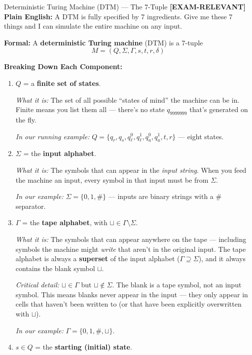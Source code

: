 \documentclass[11pt,a4paper]{article}
\newcommand{\kemark}{\textcolor{red!70!black}{\textbf{[EXAM-RELEVANT]}}}
\begin{document}
\begin{definitionbox}{Deterministic Turing Machine (DTM) --- The 7-Tuple \kemark}
\textbf{Plain English:} A DTM is fully specified by 7 ingredients. Give me these 7 things and I can simulate the entire machine on any input.

\textbf{Formal:} A \textbf{deterministic Turing machine} (DTM) is a 7-tuple
$$M = (Q, \Sigma, \Gamma, s, t, r, \delta)$$

\textbf{Breaking Down Each Component:}

\begin{enumerate}
\item $Q$ = a \textbf{finite set of states}.

\textit{What it is:} The set of all possible ``states of mind'' the machine can be in. Finite means you list them all --- there's no state $q_{9999999}$ that's generated on the fly.

\textit{In our running example:} $Q = \{q_r, q_s, q_\ell^0, q_\ell^1, q_a^0, q_a^1, t, r\}$ --- eight states.

\item $\Sigma$ = the \textbf{input alphabet}.

\textit{What it is:} The symbols that can appear in the \textit{input string}. When you feed the machine an input, every symbol in that input must be from $\Sigma$.

\textit{In our example:} $\Sigma = \{0, 1, \#\}$ --- inputs are binary strings with a \# separator.

\item $\Gamma$ = the \textbf{tape alphabet}, with $\sqcup \in \Gamma \setminus \Sigma$.

\textit{What it is:} The symbols that can appear anywhere on the tape --- including symbols the machine might \textit{write} that aren't in the original input. The tape alphabet is always a \textbf{superset} of the input alphabet ($\Gamma \supseteq \Sigma$), and it always contains the blank symbol $\sqcup$.

\textit{Critical detail:} $\sqcup \in \Gamma$ but $\sqcup \notin \Sigma$. The blank is a tape symbol, not an input symbol. This means blanks never appear in the input --- they only appear in cells that haven't been written to (or that have been explicitly overwritten with $\sqcup$).

\textit{In our example:} $\Gamma = \{0, 1, \#, \sqcup\}$.

\item $s \in Q$ = the \textbf{starting (initial) state}.


\end{enumerate}
\end{definitionbox}
\end{document}
